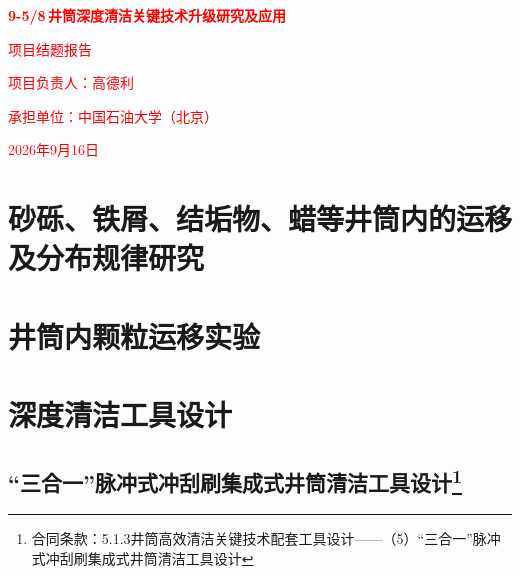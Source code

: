 \documentclass[12pt, a4paper, zihao=-4, openright]{ctexrep}
\newcommand{\inch}{\,\text{''}} %
\begin{document}
\begin{titlepage}
    \centering 
    \vspace*{4cm} 
    {\Huge \bfseries \textcolor{red}{9-5/8\inch 井筒深度清洁关键技术升级研究及应用} \par} 
    \vspace{2cm} 
    {\Large \textcolor{red}{项目结题报告} \par} 
    \vspace{4cm} 
    {\Large \textcolor{red}{项目负责人：高德利} \par}
    \vspace{1cm}
    {\Large \textcolor{red}{承担单位：中国石油大学（北京）} \par}
    \vspace{1cm}
    {\Large \textcolor{red}{2026年9月16日} \par}
\end{titlepage}

\clearpage
{} 
\tableofcontents

\clearpage
{} 
\setcounter{page}{1}   


\chapter{砂砾、铁屑、结垢物、蜡等井筒内的运移及分布规律研究}
\chapter{井筒内颗粒运移实验}
\chapter{深度清洁工具设计}
\section[“三合一”脉冲式冲刮刷集成式井筒清洁工具设计]{“三合一”脉冲式冲刮刷集成式井筒清洁工具设计\protect\footnote{合同条款：5.1.3井筒高效清洁关键技术配套工具设计——（5）“三合一”脉冲式冲刮刷集成式井筒清洁工具设计}}\label{sec:design_of_3_in_1}
	
	
	
	
\end{document}
